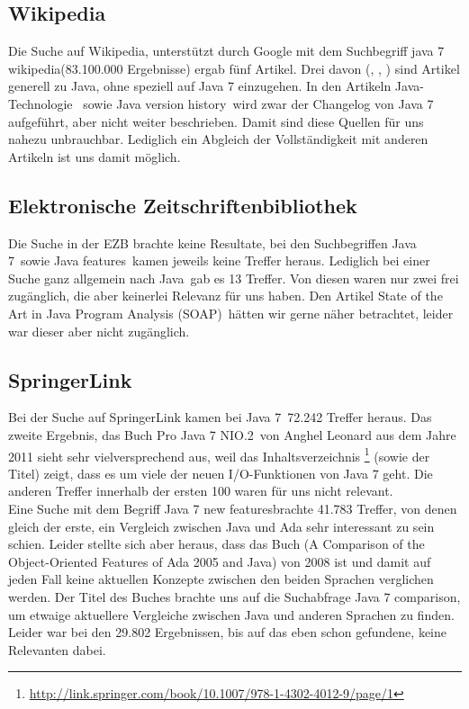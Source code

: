 \subsection{Wikipedia}
Die Suche auf Wikipedia, unterstützt durch Google mit dem Suchbegriff \glqq java 7 wikipedia\grqq (83.100.000 Ergebnisse) ergab
fünf Artikel. Drei davon (\cite{wikiJavaSoftwarePlatform}, \cite{wikiJavaProgrammiersprache}, \cite{wikiJavaStandardEdition})
sind Artikel generell zu Java, ohne speziell auf Java 7 einzugehen. In den Artikeln \glqq Java-Technologie\grqq\cite{wikiJavaTechnologie}
~sowie \glqq Java version history\grqq\cite{wikiJavaVersionHistory}~wird zwar der Changelog von Java 7 aufgeführt, aber nicht
weiter beschrieben. Damit sind diese Quellen für uns nahezu unbrauchbar. Lediglich ein Abgleich der Vollständigkeit mit anderen
Artikeln ist uns damit möglich.

\subsection{Elektronische Zeitschriftenbibliothek}
Die Suche in der EZB brachte keine Resultate, bei den Suchbegriffen \glqq Java 7\grqq~sowie \glqq Java features\grqq~kamen
jeweils keine Treffer heraus. Lediglich bei einer Suche ganz allgemein nach \glqq Java\grqq~gab es 13 Treffer. Von diesen waren
nur zwei frei zugänglich, die aber keinerlei Relevanz für uns haben. Den Artikel \glqq State of the Art in Java Program Analysis
(SOAP)\grqq~hätten wir gerne näher betrachtet, leider war dieser aber nicht zugänglich.

\subsection{SpringerLink}
Bei der Suche auf SpringerLink kamen bei \glqq Java 7\grqq~72.242 Treffer heraus. Das zweite Ergebnis, das Buch \glqq Pro Java 7
NIO.2\grqq\cite{proJava7}~von Anghel Leonard aus dem Jahre 2011 sieht sehr vielversprechend aus, weil das Inhaltsverzeichnis
\footnote{\url{http://link.springer.com/book/10.1007/978-1-4302-4012-9/page/1}} (sowie der Titel) zeigt, dass es um viele der neuen
I/O-Funktionen von Java 7 geht.
Die anderen Treffer innerhalb der ersten 100 waren für uns nicht relevant.\\

Eine Suche mit dem Begriff \glqq Java 7 new features\grqq brachte 41.783 Treffer, von denen gleich der erste, ein Vergleich zwischen
Java und Ada sehr interessant zu sein schien. Leider stellte sich aber heraus, dass das Buch 
(\glqq A Comparison of the Object-Oriented Features of Ada 2005 and Java\grqq\cite{adacomparison}) von 2008 ist 
und damit auf jeden Fall keine aktuellen Konzepte zwischen den beiden Sprachen verglichen werden.
Der Titel des Buches brachte uns auf die Suchabfrage \glqq Java 7 comparison\grqq, um etwaige aktuellere Vergleiche zwischen
Java und anderen Sprachen zu finden. Leider war bei den 29.802 Ergebnissen, bis auf das eben schon gefundene, keine Relevanten
dabei.

